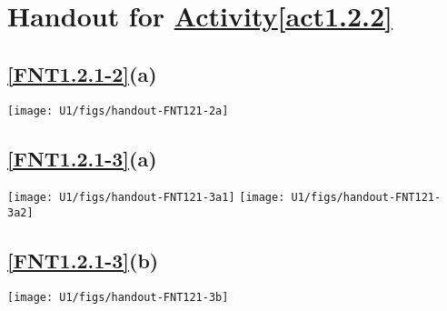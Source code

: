 \section{Handout for \hyperref[act1.2.2]{Activity\about\ref*{act1.2.2}}}

\subsection*{\ref{FNT1.2.1-2}(a)}

\noindent
\texttt{[image: U1/figs/handout-FNT121-2a]}

\subsection*{\ref{FNT1.2.1-3}(a)}

\noindent
\texttt{[image: U1/figs/handout-FNT121-3a1]}
\;
\texttt{[image: U1/figs/handout-FNT121-3a2]}

\subsection*{\ref{FNT1.2.1-3}(b)}

\noindent
\texttt{[image: U1/figs/handout-FNT121-3b]}